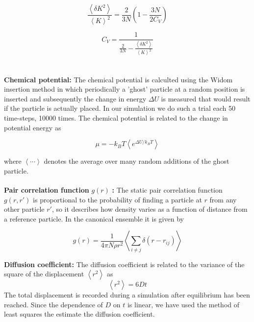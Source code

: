 \documentclass{article}
\begin{document}
\begin{equation}
 \frac{\left\langle \delta K^2 \right\rangle}{\left\langle K \right\rangle^2}=\frac{2}{3N} \left(  1-\frac{3N}{2C_V} \right)
\end{equation} 

\begin{equation}
 C_V= \frac{1}{  \frac{2}{3N}-\frac{\left\langle \delta K^2 \right\rangle}{\left\langle K \right\rangle^2} }
\end{equation} \\ \\

\textbullet \textbf{ Chemical potential: } The chemical potential is calculted using the Widom insertion method \citep{widom} in which periodically a 'ghost' particle at a random position is inserted and subsequently the change in energy $\Delta U$ is measured that would result if the particle is actually placed. In our simulation we do such a trial each 50 time-steps, 10000 times. The chemical potential is related to the change in potential energy as

\begin{equation}
 \mu = -k_B T \left\langle e^{\Delta U/k_B T} \right\rangle
\end{equation} 

where $\left\langle \cdots \right\rangle$ denotes the average over many random additions of the ghost particle.\\ \\
\textbullet \textbf{ Pair correlation function} $g(r)$ \textbf{: } The static pair correlation function $g(r,r')$ is proportional to the probability of finding a particle at $r$ from any other particle $r'$, so it describes how density varies as a function of distance from a reference particle. In the canonical ensemble it is given by

\begin{equation}
 g(r)=\frac{1}{4\pi N \rho r^2} \left\langle  \sum_{i \ne j} \delta(r-r_{ij}) \right\rangle
\end{equation}

\textbullet \textbf{ Diffusion coefficient: } The diffusion coefficient is related to the variance of the square of the displacement $\left\langle r^2 \right\rangle$ as
\begin{equation}
 \left\langle r^2 \right\rangle=6Dt
\end{equation}
The total displacement is recorded during a simulation after equilibrium has been reached. Since the dependence of $D$ on $t$ is linear, we have used the method of least squares the estimate the diffusion coefficient.
\end{document}
